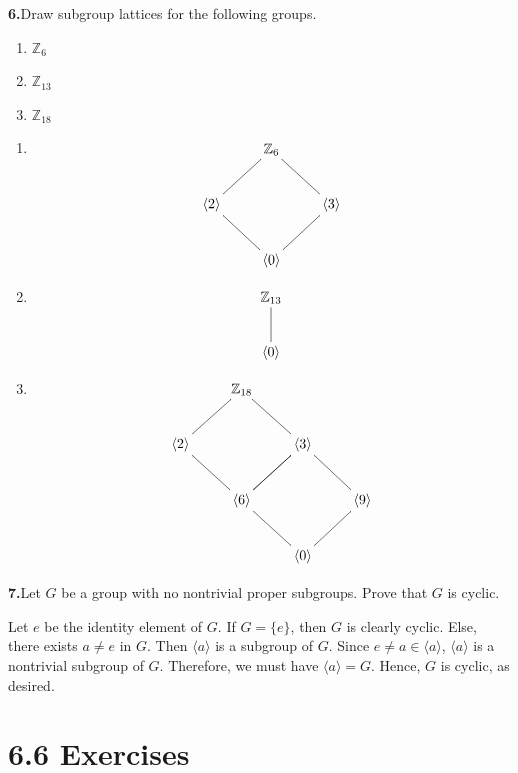 \documentclass[10pt,]{book}
\theoremstyle{plain}
\theoremstyle{definition}
\theoremstyle{definition}
\theoremstyle{definition}
\theoremstyle{definition}
\numberwithin{equation}{section}
\def\Z{\mathbb{Z}}
\begin{document}
\par\smallskip
\noindent\textbf{6.}\quad{}Draw subgroup lattices for the following groups. \leavevmode%
\begin{multicols}{3}
\begin{enumerate}[label=(\alph*)]
\item\hypertarget{li-318}{}\(\Z_6\)%
\item\hypertarget{li-319}{}\(\Z_{13}\)%
\item\hypertarget{li-320}{}\(\Z_{18}\)%
\end{enumerate}
\end{multicols}
%
\par\smallskip
\leavevmode%
\begin{enumerate}[label=(\alph*)]
\item\hypertarget{li-321}{}{
\[\xymatrix{&\Z_6&\\ \langle 2\rangle \ar@{-}[ur]&&\langle 3\rangle\ar@{-}[ul]\\&\langle 0\rangle \ar@{-}[ul]\ar@{-}[ur]&}\]
}
%
\item\hypertarget{li-322}{}{
\[\xymatrix{\Z_{13}\ar@{-}[d]\\ \langle0\rangle}\]
}
%
\item\hypertarget{li-323}{}{
\[\xymatrix{&\Z_{18}&&\\ \langle 2\rangle\ar@{-}[ur]\ar@{-}[dr]&&\langle 3\rangle\ar@{-}[ul]\ar@{-}[dl]&\\
&\langle 6 \rangle \ar@{-}[dr]\ar@{-}[ur]&& \langle 9 \rangle \ar@{-}[dl]\ar@{-}[ul]\\&& \langle 0 \rangle &}\]
}
%
\end{enumerate}
\par\smallskip
\noindent\textbf{7.}\quad{}Let \(G\) be a group with no nontrivial proper subgroups. Prove that \(G\) is cyclic.%
\par\smallskip
Let \(e\) be the identity element of \(G\). If \(G=\{e\}\), then \(G\) is clearly cyclic. Else, there exists \(a\neq e\) in \(G\). Then \(\langle a\rangle\) is a subgroup of \(G\). Since \(e\neq a\in
\langle a\rangle\), \(\langle a\rangle\) is a nontrivial subgroup of \(G\). Therefore, we must have \(\langle a\rangle =G\). Hence, \(G\) is cyclic, as desired.%
\par\smallskip
\section*{6.6 Exercises}
\end{document}

